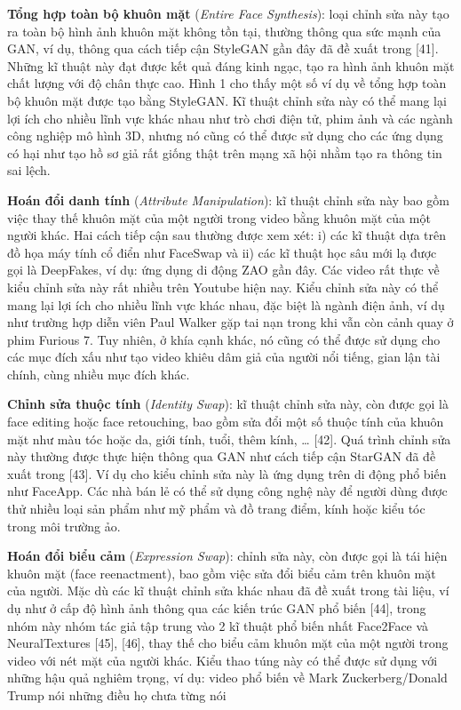 \documentclass{article}
\begin{document}
\textbf{Tổng hợp toàn bộ khuôn mặt} (\textit{Entire Face Synthesis}): loại chỉnh sửa này tạo ra toàn bộ hình ảnh khuôn mặt không tồn tại, thường thông qua sức mạnh của GAN, ví dụ, thông qua cách tiếp cận StyleGAN gần đây đã đề xuất trong [41]. Những kĩ thuật này đạt được kết quả đáng kinh ngạc, tạo ra hình ảnh khuôn mặt chất lượng với độ chân thực cao. Hình 1 cho thấy một số ví dụ về tổng hợp toàn bộ khuôn mặt được tạo bằng StyleGAN. Kĩ thuật chỉnh sửa này có thể mang lại lợi ích cho nhiều lĩnh vực khác nhau như trò chơi điện tử, phim ảnh và các ngành công nghiệp mô hình 3D, nhưng nó cũng có thể được sử dụng cho các ứng dụng có hại như tạo hồ sơ giả rất giống thật trên mạng xã hội nhằm tạo ra thông tin sai lệch.

\textbf{Hoán đổi danh tính} (\textit{Attribute Manipulation}): kĩ thuật chỉnh sửa này bao gồm việc thay thế khuôn mặt của một người trong video bằng khuôn mặt của một người khác. Hai cách tiếp cận sau thường được xem xét: i) các kĩ thuật dựa trên đồ họa máy tính cổ điển như FaceSwap và ii) các kĩ thuật học sâu mới lạ được gọi là DeepFakes, ví dụ: ứng dụng di động ZAO gần đây. Các video rất thực về kiểu chỉnh sửa này rất nhiều trên Youtube hiện nay. Kiểu chỉnh sửa này có thể mang lại lợi ích cho nhiều lĩnh vực khác nhau, đặc biệt là ngành điện ảnh, ví dụ như trường hợp diễn viên Paul Walker gặp tai nạn trong khi vẫn còn cảnh quay ở phim Furious 7. Tuy nhiên, ở khía cạnh khác, nó cũng có thể được sử dụng cho các mục đích xấu như tạo video khiêu dâm giả của người nổi tiếng, gian lận tài chính, cùng nhiều mục đích khác.

\textbf{Chỉnh sửa thuộc tính} (\textit{Identity Swap}): kĩ thuật chỉnh sửa này, còn được gọi là face editing hoặc face retouching, bao gồm sửa đổi một số thuộc tính của khuôn mặt như màu tóc hoặc da, giới tính, tuổi, thêm kính, … [42]. Quá trình chỉnh sửa này thường được thực hiện thông qua GAN như cách tiếp cận StarGAN đã đề xuất trong [43]. Ví dụ cho kiểu chỉnh sửa này là ứng dụng trên di động phổ biến như FaceApp. Các nhà bán lẻ có thể sử dụng công nghệ này để người dùng được thử nhiều loại sản phẩm như mỹ phẩm và đồ trang điểm, kính hoặc kiểu tóc trong môi trường ảo.

\textbf{Hoán đổi biểu cảm} (\textit{Expression Swap}): chỉnh sửa này, còn được gọi là tái hiện khuôn mặt (face reenactment), bao gồm việc sửa đổi biểu cảm trên khuôn mặt của người. Mặc dù các kĩ thuật chỉnh sửa khác nhau đã đề xuất trong tài liệu, ví dụ như ở cấp độ hình ảnh thông qua các kiến trúc GAN phổ biến [44], trong nhóm này nhóm tác giả tập trung vào 2 kĩ thuật phổ biến nhất Face2Face và NeuralTextures [45], [46], thay thế cho biểu cảm khuôn mặt của một người trong video với nét mặt của người khác. Kiểu thao túng này có thể được sử dụng với những hậu quả nghiêm trọng, ví dụ: video phổ biến về Mark Zuckerberg/Donald Trump nói những điều họ chưa từng nói
\end{document}
